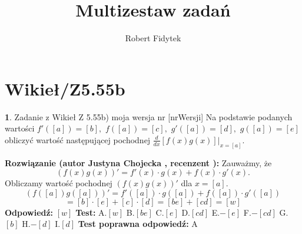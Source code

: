 \documentclass[12pt, a4paper]{article}
\title{Multizestaw zadań}
\author{Robert Fidytek}
\date{}
\theoremstyle{definition} %
\newtheorem{zad}{}
\newcommand{\kategoria}[1]{\section{#1}} %
\newcommand{\zadStart}[1]{\begin{zad}#1\newline} %
\newcommand{\zadStop}{\end{zad}}   %
\newcommand{\rozwStart}[2]{\noindent \textbf{Rozwiązanie (autor #1 , recenzent #2): }\newline} %
\newcommand{\rozwStop}{\newline}                                            %
\newcommand{\odpStart}{\noindent \textbf{Odpowiedź:}\newline}    %
\newcommand{\odpStop}{\newline}                                             %
\newcommand{\testStart}{\noindent \textbf{Test:}\newline} %
\newcommand{\testStop}{\newline} %
\newcommand{\kluczStart}{\noindent \textbf{Test poprawna odpowiedź:}\newline} %
\newcommand{\kluczStop}{\newline} %
\begin{document}
\maketitle


\kategoria{Wikieł/Z5.55b}
\zadStart{Zadanie z Wikieł Z 5.55b) moja wersja nr [nrWersji]}
Na podstawie podanych wartości $f'([a])=[b],$ $f([a])=[c],$ $g'([a])=[d],$ $g([a])=[e]$ obliczyć wartość następującej pochodnej $\frac{d}{dx}\left[f(x)g(x)\right]|_{x=[a]}$.
\zadStop
\rozwStart{Justyna Chojecka}{}
Zauważmy, że 
$$\left(f(x)g(x)\right)'=f'(x)\cdot g(x)+f(x)\cdot g'(x).$$
Obliczamy wartość pochodnej $\left(f(x)g(x)\right)'$ dla $x=[a]$.
$$\left(f([a])g([a])\right)'=f'([a])\cdot g([a])+f([a])\cdot g'([a])$$$$=[b]\cdot [e]+[c]\cdot [d]=[be]+[cd]=[w]$$
\rozwStop
\odpStart
$[w]$
\odpStop
\testStart
A.$[w]$
B.$[be]$
C.$[e]$
D.$[cd]$
E.$-[e]$
F.$-[cd]$
G.$[b]$
H.$-[d]$
I.$[d]$
\testStop
\kluczStart
A
\kluczStop
\end{document}
